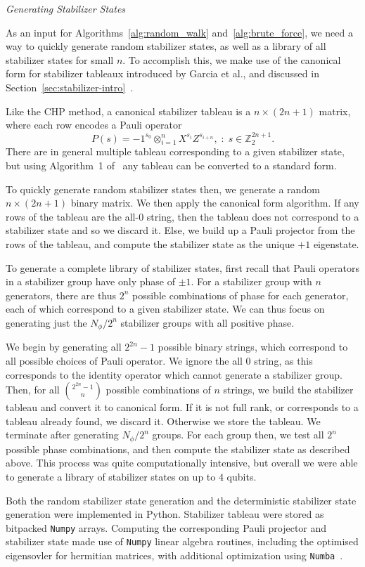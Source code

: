 \par\large{\itshape{Generating Stabilizer States}}\par
As an input for Algorithms~\ref{alg:random_walk} and~\ref{alg:brute_force}, we need a way to quickly generate random stabilizer states, as well as a library of all stabilizer states for small $n$. To accomplish this, we make use of the canonical form for stabilizer tableaux introduced by Garcia et al., and discussed in Section~\ref{sec:stabilizer-intro}~\cite{Garcia2012}.\par
Like the CHP method, a canonical stabilizer tableau is a $n \times \left(2n+1\right)$ matrix, where each row encodes a Pauli operator
\[P\left(s\right)=-1^{s_{0}}\otimes_{i=1}^{n}X^{s_{i}}Z^{s_{i+n}},\;:\;s\in\mathbb{Z}_{2}^{2n+1}.\]
There are in general multiple tableau corresponding to a given stabilizer state, but using Algorithm~1 of~\cite{Garcia2012} any tableau can be converted to a standard form.\par
To quickly generate random stabilizer states then, we generate a random $n \times \left(2n+1\right)$ binary matrix. We then apply the canonical form algorithm. If any rows of the tableau are the all-$0$ string, then the tableau does not correspond to a stabilizer state and so we discard it. Else, we build up a Pauli projector from the rows of the tableau, and compute the stabilizer state as the unique $+1$ eigenstate.\par
To generate a complete library of stabilizer states, first recall that Pauli operators in a stabilizer group have only phase of $\pm 1$. For a stabilizer group with $n$ generators, there are thus $2^{n}$ possible combinations of phase for each generator, each of which correspond to a given stabilizer state. We can thus focus on generating just the $N_{\phi}/2^{n}$ stabilizer groups with all positive phase.\par
We begin by generating all $2^{2n}-1$ possible binary strings, which correspond to all possible choices of Pauli operator. We ignore the all $0$ string, as this corresponds to the identity operator which cannot generate a stabilizer group. Then, for all $\binom{2^{2n}-1}{n}$ possible combinations of $n$ strings, we build the stabilizer tableau and convert it to canonical form. If it is not full rank, or corresponds to a tableau already found, we discard it. Otherwise we store the tableau. We terminate after generating $N_{\phi}/2^{n}$ groups. For each group then, we test all $2^{n}$ possible phase combinations, and then compute the stabilizer state as described above. This process was quite computationally intensive, but overall we were able to generate a library of stabilizer states on up to $4$ qubits.\par
Both the random stabilizer state generation and the deterministic stabilizer state generation were implemented in Python. Stabilizer tableau were stored as bitpacked \texttt{Numpy} arrays. Computing the corresponding Pauli projector and stabilizer state made use of \texttt{Numpy} linear algebra routines, including the optimised eigensovler for hermitian matrices, with additional optimization using \texttt{Numba}~\cite{Numpy,Numba}.
